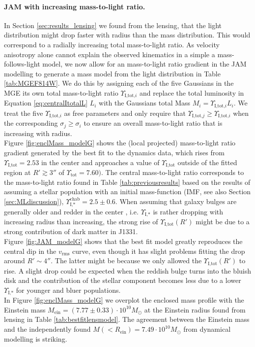 \paragraph{JAM with increasing mass-to-light ratio.} In Section \ref{sec:results_lensing} we found from the lensing, that the light distribution might drop faster with radius than the mass distribution. This would correspond to a radially increasing total mass-to-light ratio. As velocity anisotropy alone cannot explain the observed kinematics in a simple a mass-follows-light model, we now allow for an mass-to-light ratio gradient in the JAM modelling to generate a mass model from the light distribution in Table \ref{tab:MGEF814W}. We do this by assigning each of the five Gaussians in the MGE its own total mass-to-light ratio $\Upsilon_{\text{I,tot,}i}$ and replace the total luminosity in Equation \ref{eq:centralItotalL} $L_i$ with the Gaussians total Mass $M_i = \Upsilon_{\text{I,tot,}i} L_i$. We treat the five $\Upsilon_{\text{I,tot,}i}$ as free parameters and only require that $\Upsilon_{\text{I,tot,}j} \geq \Upsilon_{\text{I,tot,}i}$ when the corresponding $\sigma_j \geq \sigma_i$ to ensure an overall mass-to-light ratio that is increasing with radius.
\\Figure \ref{fig:enclMass_modelG} shows the (local projected) mass-to-light ratio gradient generated by the best fit to the dynamics data, which rises from $\Upsilon_\text{I,tot} = 2.53$ in the center and approaches a value of $\Upsilon_\text{I,tot}$ outside of the fitted region at $R'\gtrsim 3''$ of $\Upsilon_\text{tot} = 7.60)$. The central mass-to-light ratio corresponds to the mass-to-light ratio found in Table \ref{tab:previousresults} based on the results of \citet{SWELLSI} assuming a stellar population with an \citet{Chabrier2003} initial mass-function (IMF, see also Section \ref{sec:MLdiscussion}), $\Upsilon_\text{I,*}^\text{chab} = 2.5 \pm 0.6$. When assuming that galaxy bulges are generally older and redder in the center \Wilma{[TO DO: REF]}, i.e. $\Upsilon_\text{I,*}$ is rather dropping with increasing radius than increasing, the strong rise of $\Upsilon_\text{I,tot}(R')$ might be due to a strong contribution of dark matter in J1331.
\\Figure \ref{fig:JAM_modelG} shows that the best fit model greatly reproduces the central dip in the $v_\text{rms}$ curve, even though it has slight problems fitting the drop around $R' \sim 4''$. The latter might be because we only allowed the $\Upsilon_\text{I,tot}(R')$ to rise. A slight drop could be expected when the reddish bulge turns into the bluish disk and the contribution of the stellar component becomes less due to a lower $\Upsilon_\text{I,*}$ for younger and bluer populations.
\\In Figure \ref{fig:enclMass_modelG} we overplot the enclosed mass profile with the Einstein mass $M_\text{ein} = (7.77 \pm 0.33) \cdot 10^{10} M_\odot$ at the Einstein radius found from lensing in Table \ref{tab:bestfitlensmodel}. The agreement between the Einstein mass and the independently found $M(<R_\text{ein}) = 7.49 \cdot 10^{10} M_\odot$ from dynamical modelling is striking.


